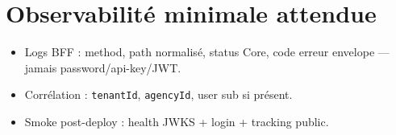 \section{Observabilité minimale attendue}

\begin{itemize}
  \item Logs BFF : method, path normalisé, status Core, code erreur envelope
        --- jamais password/api-key/JWT.
  \item Corrélation : \texttt{tenantId}, \texttt{agencyId}, user sub si présent.
  \item Smoke post-deploy : health JWKS + login + tracking public.
\end{itemize}
